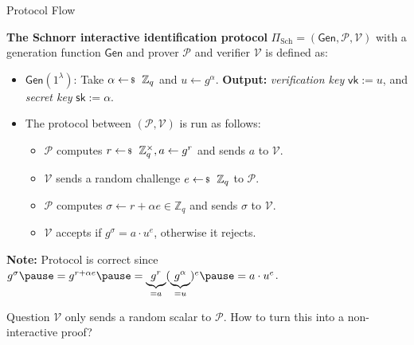\documentclass{zkdl-presentation-template}
\begin{document}
    \begin{frame}{Protocol Flow}
        \begin{definition}
            \small
            \textbf{The Schnorr interactive identification protocol} $\Pi_{\text{Sch}} = (\mathsf{Gen}, \mathcal{P}, \mathcal{V})$ with a generation function $\mathsf{Gen}$ and prover $\mathcal{P}$ and verifier $\mathcal{V}$ is defined as:
            \begin{itemize}
                \item $\mathsf{Gen}(1^{\lambda})$: Take $\alpha \leftarrowS \mathbb{Z}_q$ and $u \gets g^{\alpha}$. \textbf{Output:} \textit{verification key} $\mathsf{vk} := u$, and \textit{secret key} $\mathsf{sk} := \alpha$.\pause
                \item The protocol between $(\mathcal{P},\mathcal{V})$ is run as follows:
                \begin{itemize}
                    \item $\mathcal{P}$ computes $r \leftarrowS \mathbb{Z}_q^{\times}, a \gets g^{r}$ and sends $a$ to $\mathcal{V}$.\pause
                    \item $\mathcal{V}$ sends a random challenge $e \leftarrowS \mathbb{Z}_q$ to $\mathcal{P}$.\pause
                    \item $\mathcal{P}$ computes $\sigma \gets r + \alpha e \in \mathbb{Z}_q$ and sends $\sigma$ to $\mathcal{V}$.\pause
                    \item $\mathcal{V}$ accepts if $g^{\sigma} = a \cdot u^e$, otherwise it rejects.\pause
                \end{itemize}
            \end{itemize}
        \end{definition}

        \textbf{Note:} Protocol is correct since $g^{\sigma}\pause =g^{r+\alpha e}\pause = \underbrace{g^r}_{=a}(\underbrace{g^{\alpha}}_{=u})^e\pause = a\cdot u^e$.
        \pause

        \begin{questionblock}{Question}
            $\mathcal{V}$ only sends a random scalar to $\mathcal{P}$. How to turn this into a non-interactive proof?
        \end{questionblock}
    \end{frame}
\end{document}
